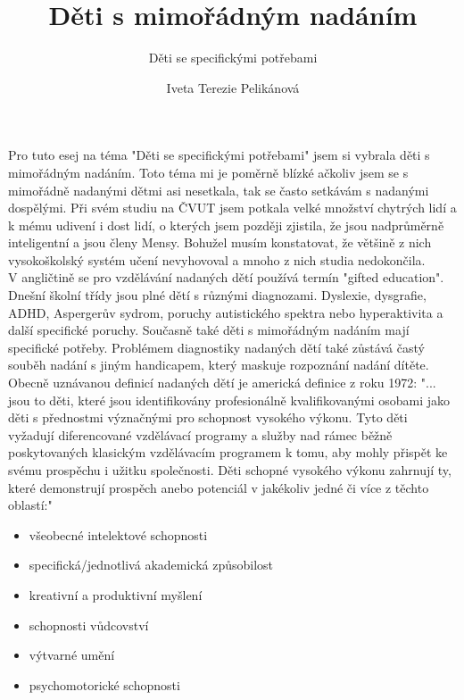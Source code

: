 \documentclass[a4paper]{scrartcl}
\title{Děti s mimořádným nadáním}
\subtitle{Děti se specifickými potřebami}
\author{Iveta Terezie Pelikánová}
\date{}
\begin{document}
\maketitle 

\noindent

Pro tuto esej na téma "Děti se specifickými potřebami" jsem si vybrala děti s mimořádným nadáním. Toto téma mi je poměrně blízké ačkoliv jsem se s mimořádně nadanými dětmi asi nesetkala, tak se často setkávám s nadanými dospělými. Při svém studiu na ČVUT jsem potkala velké množství chytrých lidí a k mému udivení i dost lidí, o kterých jsem později zjistila, že jsou nadprůměrně inteligentní a jsou členy Mensy. Bohužel musím konstatovat, že většině z nich vysokoškolský systém učení nevyhovoval a mnoho z nich studia nedokončila. \\

V angličtině se pro vzdělávání nadaných dětí používá termín "gifted education". Dnešní školní třídy jsou plné dětí s různými diagnozami. Dyslexie, dysgrafie, ADHD, Aspergerův sydrom, poruchy autistického spektra nebo hyperaktivita a další specifické poruchy. Současně také děti s mimořádným nadáním mají specifické potřeby. Problémem diagnostiky nadaných dětí také zůstává častý souběh nadání s jiným handicapem, který maskuje rozpoznání nadání dítěte.\\

Obecně uznávanou definicí nadaných dětí je americká definice z roku 1972: "... jsou to děti, které jsou identifikovány profesionálně kvalifikovanými osobami jako děti s přednostmi význačnými pro schopnost vysokého výkonu. Tyto děti vyžadují diferencované vzdělávací programy a služby nad rámec běžně poskytovaných klasickým vzdělávacím programem k tomu, aby mohly přispět ke svému prospěchu i užitku společnosti. Děti schopné vysokého výkonu zahrnují ty, které demonstrují prospěch anebo potenciál v jakékoliv jedné či více z těchto oblastí:"\cite{def_nadane_deti}

\begin{itemize}
    \item všeobecné intelektové schopnosti
    \item specifická/jednotlivá akademická způsobilost
    \item kreativní a produktivní myšlení
    \item schopnosti vůdcovství
    \item výtvarné umění
    \item psychomotorické schopnosti
\end{itemize}
\end{document}
